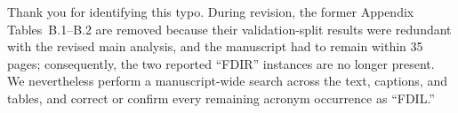 {Thank you for identifying this typo. During revision, the former Appendix Tables~B.1--B.2 are removed because their validation-split results were redundant with the revised main analysis, and the manuscript had to remain within 35 pages; consequently, the two reported ``FDIR'' instances are no longer present. We nevertheless perform a manuscript-wide search across the text, captions, and tables, and correct or confirm every remaining acronym occurrence as ``FDIL.''
}
